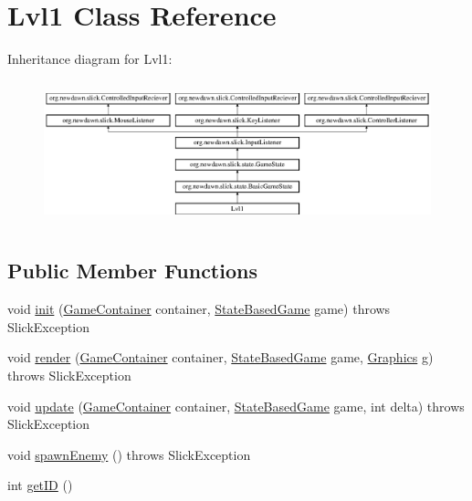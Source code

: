 \hypertarget{class_lvl1}{}\section{Lvl1 Class Reference}
\label{class_lvl1}
Inheritance diagram for Lvl1\+:\begin{figure}[H]
\begin{center}
\leavevmode
\includegraphics[height=4.226415cm]{class_lvl1}
\end{center}
\end{figure}
\subsection*{Public Member Functions}
\begin{DoxyCompactItemize}
\item 
void \mbox{\hyperlink{class_lvl1_a4b928f9625e0441dae8ed54bfdf479cc}{init}} (\mbox{\hyperlink{classorg_1_1newdawn_1_1slick_1_1_game_container}{Game\+Container}} container, \mbox{\hyperlink{classorg_1_1newdawn_1_1slick_1_1state_1_1_state_based_game}{State\+Based\+Game}} game)  throws Slick\+Exception
\item 
void \mbox{\hyperlink{class_lvl1_abd2b3619698781c674910dc755908858}{render}} (\mbox{\hyperlink{classorg_1_1newdawn_1_1slick_1_1_game_container}{Game\+Container}} container, \mbox{\hyperlink{classorg_1_1newdawn_1_1slick_1_1state_1_1_state_based_game}{State\+Based\+Game}} game, \mbox{\hyperlink{classorg_1_1newdawn_1_1slick_1_1_graphics}{Graphics}} g)  throws Slick\+Exception 
\item 
void \mbox{\hyperlink{class_lvl1_a97ca32ddae9c594af0f2ea4b93096ca2}{update}} (\mbox{\hyperlink{classorg_1_1newdawn_1_1slick_1_1_game_container}{Game\+Container}} container, \mbox{\hyperlink{classorg_1_1newdawn_1_1slick_1_1state_1_1_state_based_game}{State\+Based\+Game}} game, int delta)  throws Slick\+Exception 
\item 
void \mbox{\hyperlink{class_lvl1_a2f09cab636e2bf584a6f362c0f84c29f}{spawn\+Enemy}} ()  throws Slick\+Exception
\item 
int \mbox{\hyperlink{class_lvl1_a7753633f6de7e33f5049c3621e6cb049}{get\+ID}} ()
\end{DoxyCompactItemize}
